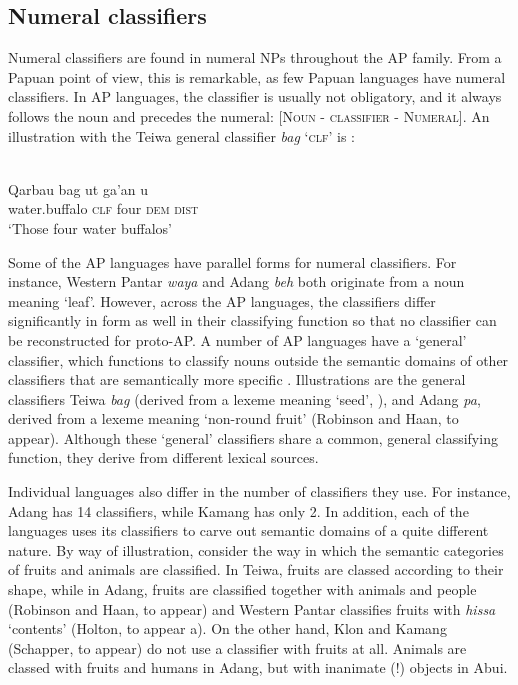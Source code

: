\subsection{Numeral classifiers}\label{sec:1:6.3}
Numeral classifiers are found in numeral NPs throughout the AP family. From a Papuan point of view, this is remarkable, as few Papuan languages have numeral classifiers. In AP languages, the classifier is usually not obligatory, and it always follows the noun and precedes the numeral: \textsc{[Noun - classifier - Numeral]. A}n illustration with the Teiwa general classifier \textit{bag} `\textsc{clf}' is :



\ea%
\label{ex:1:35}
 \\
\gll Qarbau   bag   ut   ga'an   u \\
 water.buffalo  \textsc{clf}  four  \textsc{dem  dist}  \\
\glt `Those four water buffalos'   
\z 



         

Some of the AP languages have parallel forms for numeral classifiers. For instance, Western Pantar \textit{waya} and Adang \textit{beh} both originate from a noun meaning `leaf'. However, across the AP languages, the classifiers differ significantly in form as well in their classifying function so that no classifier can be reconstructed for proto-AP. A number of AP languages have a `general' classifier, which functions to classify nouns outside the semantic domains of other classifiers that are semantically more specific \citep[cf.][]{ZubinEtAl1993}. Illustrations are the general classifiers Teiwa \textit{bag} (derived from a lexeme meaning `seed', \citealt{Klamer2014,Klamertanumeral}), and Adang \textit{pa{\textglotstop}}, derived from a lexeme meaning `non-round fruit' (Robinson and Haan, to appear). Although these `general' classifiers share a common, general classifying function, they derive from different lexical sources.

Individual languages also differ in the number of classifiers they use. For instance, Adang has 14 classifiers, while Kamang has only 2.  In addition, each of the languages uses its classifiers to carve out semantic domains of a quite different nature. By way of illustration, consider the way in which the semantic categories of fruits and animals are classified. In Teiwa, fruits are classed according to their shape, while in Adang, fruits are classified together with animals and people (Robinson and Haan, to appear) and Western Pantar classifies fruits with \textit{hissa} `contents' (Holton, to appear a). On the other hand, Klon \citep{Baird2008} and Kamang (Schapper, to appear) do not use a classifier with fruits at all. Animals are classed with fruits and humans in Adang, but with inanimate (!) objects in Abui. 

